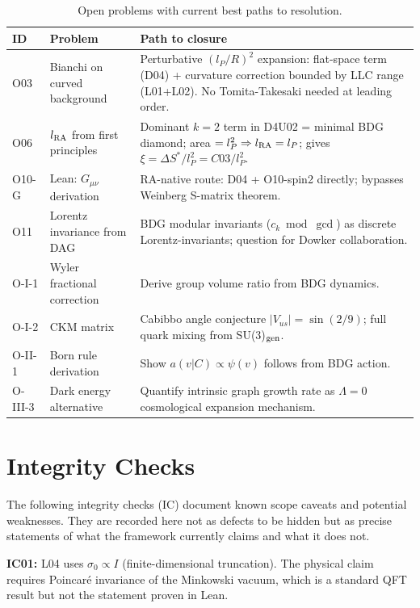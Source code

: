 \documentclass[12pt,a4paper]{article}
\begin{document}
\begin{table}[ht]
\centering
\caption{Open problems with current best paths to resolution.}
\label{tab:open}
\begin{tabular}{p{1cm}p{5cm}p{7cm}}
\toprule
ID & Problem & Path to closure \\
\midrule
O03 & Bianchi on curved background & Perturbative $(l_P/R)^2$ expansion: flat-space term (D04) + curvature correction bounded by LLC range (L01+L02). No Tomita-Takesaki needed at leading order. \\
O06 & $l_{\rm RA}$ from first principles & Dominant $k=2$ term in D4U02 = minimal BDG diamond; area $=l_P^2\Rightarrow l_{\rm RA}=l_P$; gives $\xi=\Delta S^*/l_P^2=C03/l_P^2$. \\
O10-G & Lean: $G_{\mu\nu}$ derivation & RA-native route: D04 + O10-spin2 directly; bypasses Weinberg S-matrix theorem. \\
O11 & Lorentz invariance from DAG & BDG modular invariants ($c_k\bmod\gcd$) as discrete Lorentz-invariants; question for Dowker collaboration. \\
O-I-1 & Wyler fractional correction & Derive group volume ratio from BDG dynamics. \\
O-I-2 & CKM matrix & Cabibbo angle conjecture $|V_{us}|=\sin(2/9)$; full quark mixing from SU(3)$_{\rm gen}$. \\
O-II-1 & Born rule derivation & Show $a(v|C)\propto\psi(v)$ follows from BDG action. \\
O-III-3 & Dark energy alternative & Quantify intrinsic graph growth rate as $\Lambda=0$ cosmological expansion mechanism. \\
\bottomrule
\end{tabular}
\end{table}

\section{Integrity Checks}\label{sec:ic}

The following integrity checks (IC) document known scope caveats and potential weaknesses.  They are recorded here not as defects to be hidden but as precise statements of what the framework currently claims and what it does not.

\textbf{IC01:} L04 uses $\sigma_0\propto I$ (finite-dimensional truncation).  The physical claim requires Poincar\'e invariance of the Minkowski vacuum, which is a standard QFT result but not the statement proven in Lean.
\end{document}
